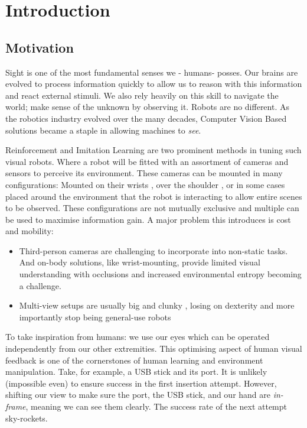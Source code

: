 \chapter{Introduction}
\section{Motivation}
    
  Sight is one of the most fundamental senses we - humans- posses.  Our brains are evolved to process information quickly to allow us to reason with this information and react external stimuli. We also rely heavily on this skill to navigate the world; make sense of the unknown by observing it. Robots are no different. As the robotics industry evolved over the many decades, Computer Vision  Based solutions became a staple in allowing machines to \emph{see}.

  Reinforcement  and Imitation Learning  are two prominent methods in tuning such visual robots. Where a robot will be fitted with an assortment of cameras and sensors to perceive its environment. These cameras can be mounted in many configurations: Mounted on their wrists \cite{chi2024UMIinthewild,openXEmbodimentRoboticLearning2024}, over the shoulder \cite{wang2024observeactasynchronousactive}, or in some cases placed around the environment \cite{exploringActiveVision2024chuang} that the robot is interacting to allow entire scenes to be observed. These configurations are not mutually exclusive and multiple can be used to maximise information gain. A major problem this introduces is cost and mobility:
  \begin{itemize}
    \item Third-person cameras are challenging to incorporate into non-static tasks. And on-body solutions, like wrist-mounting, provide limited visual understanding with occlusions and increased environmental entropy becoming a challenge. 
    \item Multi-view setups are usually big and clunky , losing on dexterity and more importantly stop being general-use robots
  \end{itemize} 

  To take inspiration from humans: we use our eyes which can be operated independently from our other extremities. This optimising aspect of human visual feedback \cite{findlay2003active,maiello2021humans,goodman2018using} is one of the cornerstones of human learning and environment manipulation. Take, for example, a USB stick and its port. It is unlikely (impossible even) to ensure success in the first insertion attempt. However, shifting our view to make sure the port, the USB stick, and our hand are \emph{in-frame}, meaning we can see them clearly. The success rate of the next attempt sky-rockets.
  
